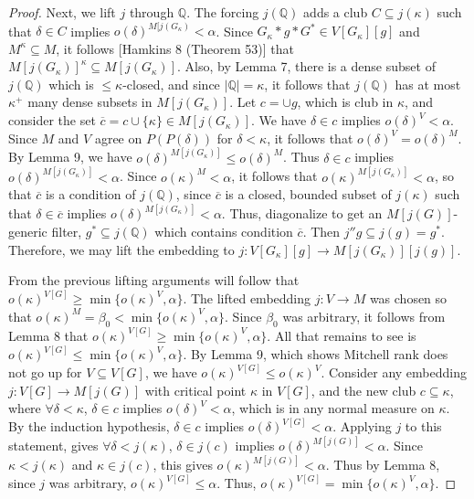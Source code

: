 \documentclass[10pt,leqno]{amsart}
\begin{document}
\begin{proof}
Next, we lift $j$ through $\mathbb{Q}$. The forcing $j(\mathbb{Q})$ adds a club $C \subseteq j(\kappa)$ such that $\delta \in C$ implies $o(\delta)^{M[j(G_{\kappa})} < \alpha$. Since $G_{\kappa}*g*G^* \in V[G_{\kappa}][g]$ and $M^{\kappa} \subseteq M$, it follows [Hamkins 8 (Theorem 53)] that $M[j(G_{\kappa})]^{\kappa} \subseteq M[j(G_{\kappa})].$ Also, by Lemma 7, there is a dense subset of $j(\mathbb{Q})$ which is $\le \kappa$-closed, and since $|\mathbb{Q}| = \kappa$, it follows that $j(\mathbb{Q})$ has at most $\kappa^+$ many dense subsets in $M[j(G_{\kappa})]$. Let $c = \cup g$, which is club in $\kappa$, and consider the set $\overline{c} = c \cup \{\kappa\} \in M[j(G_{\kappa})]$. We have $\delta \in c$ implies $o(\delta)^V < \alpha$. Since $M$ and $V$ agree on $P(P(\delta))$ for $\delta < \kappa$, it follows that $o(\delta)^V = o(\delta)^M$. By Lemma 9, we have $o(\delta)^{M[j(G_{\kappa})]} \le o(\delta)^M$. Thus $\delta \in c$ implies $o(\delta)^{M[j(G_{\kappa})]} < \alpha$. Since $o(\kappa)^M < \alpha$, it follows that $o(\kappa)^{M[j(G_{\kappa})]} < \alpha$, so that $\overline{c}$ is a condition of $j(\mathbb{Q})$, since $\overline{c}$ is a closed, bounded subset of $j(\kappa)$ such that $\delta \in \overline{c}$ implies $o(\delta)^{M[j(G_{\kappa})]} < \alpha$. Thus, diagonalize to get an $M[j(G)]$-generic filter, $g^* \subseteq j(\mathbb{Q})$ which contains condition $\overline{c}$. Then $j''g \subseteq j(g) = g^*$. Therefore, we may lift the embedding to $j:V[G_{\kappa}][g] \to M[j(G_{\kappa})][j(g)]$.  

From the previous lifting arguments will follow that $o(\kappa)^{V[G]} \ge \min\{ o(\kappa)^{V}, \alpha \}$. The lifted embedding $j: V \to M$ was chosen so that $o(\kappa)^{M} = \beta_0 < \min\{o(\kappa)^V, \alpha \}$. Since $\beta_0$ was arbitrary, it follows from Lemma 8 that $o(\kappa)^{V[G]} \ge \min\{o(\kappa)^V, \alpha\}$. All that remains to see is $o(\kappa)^{V[G]} \le \min\{o(\kappa)^V, \alpha \}$. By Lemma 9, which shows Mitchell rank does not go up for $V \subseteq V[G]$, we have $o(\kappa)^{V[G]} \le o(\kappa)^V$. Consider any embedding $j:V[G] \to M[j(G)]$ with critical point $\kappa$ in $V[G]$, and the new club $c \subseteq \kappa$, where $\forall \delta < \kappa$, $\delta \in c$ implies $o(\delta)^V < \alpha$, which is in any normal measure on $\kappa$. By the induction hypothesis, $\delta \in c$ implies $o(\delta)^{V[G]} < \alpha$. Applying $j$ to this statement, gives $\forall \delta < j(\kappa)$, $\delta \in j(c)$ implies $o(\delta)^{M[j(G)]} < \alpha$. Since $\kappa < j(\kappa)$ and $\kappa \in j(c)$, this gives $o(\kappa)^{M[j(G)]} < \alpha$. Thus by Lemma 8, since $j$ was arbitrary, $o(\kappa)^{V[G]} \le \alpha$. Thus, $o(\kappa)^{V[G]} = \min\{o(\kappa)^V, \alpha\}$.
\end{proof}
\end{document}
